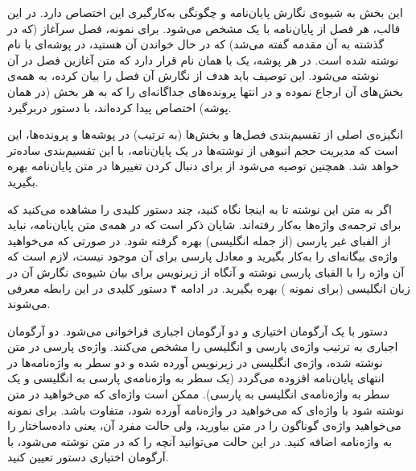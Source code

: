 
این بخش به شیوه‌ی نگارش پایان‌نامه و چگونگی به‌کارگیری این  اختصاص دارد.
در این قالب، هر فصل از پایان‌نامه با یک  مشخص می‌شود. برای نمونه، فصل سرآغاز (که در گذشته به آن مقدمه گفته می‌شد) که در حال خواندن آن هستید، در پوشه‌ای با نام  نوشته شده است. در هر پوشه، یک  با همان نام قرار دارد که متن آغازین فصل در آن نوشته می‌شود. این توصیف باید هدف از نگارش آن فصل را بیان کرده، به همه‌ی بخش‌های آن ارجاع نموده و در انتها پرونده‌های جداگانه‌ای را که به هر بخش (در همان پوشه) اختصاص پیدا کرده‌اند، با دستور  دربرگیرد.

انگیزه‌ی اصلی از تقسیم‌بندی فصل‌ها و بخش‌ها (به ترتیب) در پوشه‌ها و پرونده‌ها، این است که مدیریت حجم انبوهی از نوشته‌ها در یک پایان‌نامه، با این تقسیم‌بندی ساده‌تر خواهد شد. همچنین توصیه می‌شود از   برای دنبال کردن تغییرها در متن پایان‌نامه بهره بگیرید.

اگر به متن  این نوشته تا به اینجا نگاه کنید، چند دستور کلیدی را مشاهده می‌کنید که برای ترجمه‌ی واژه‌ها به‌کار رفته‌اند. شایان ذکر است که در همه‌ی متن پایان‌نامه، نباید از الفبای غیر پارسی (از جمله انگلیسی) بهره گرفته شود. در صورتی که می‌خواهید واژه‌ی بیگانه‌ای را به‌کار بگیرید و معادل پارسی برای آن موجود نیست، لازم است که آن واژه را با الفبای پارسی نوشته و آنگاه از زیرنویس برای بیان شیوه‌ی نگارش آن در زبان انگلیسی (برای نمونه ) بهره  بگیرید. در ادامه ۴ دستور کلیدی در این رابطه معرفی می‌شوند.

	 دستور  با یک آرگومان اختیاری و دو آرگومان اجباری فراخوانی می‌شود. دو آرگومان اجباری به ترتیب واژه‌ی پارسی و انگلیسی را مشخص می‌کنند. واژه‌ی پارسی در متن نوشته شده، واژه‌ی انگلیسی در زیرنویس آورده شده و دو سطر به واژه‌نامه‌ها در انتهای پایان‌نامه افزوده می‌گردد (یک سطر به واژه‌نامه‌ی پارسی به انگلیسی و یک سطر به واژه‌نامه‌ی انگلیسی به پارسی). ممکن است واژه‌ای که می‌خواهید در متن نوشته شود با واژه‌ای که می‌خواهید در واژه‌نامه آورده شود، متفاوت باشد. برای نمونه می‌خواهید واژه‌ی  گوناگون را در متن بیاورید، ولی حالت مفرد آن، یعنی داده‌ساختار را به واژه‌نامه اضافه کنید. در این حالت می‌توانید آنچه را که در متن نوشته می‌شود، با آرگومان اختیاری دستور  تعیین کنید.
	
